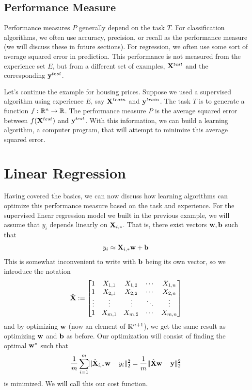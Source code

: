 \subsection{Performance Measure}

Performance measures $P$ generally depend on the task $T$. For classification algorithms, we often use accuracy, precision, or recall as the performance measure (we will discuss these in future sections). For regression, we often use some sort of average squared error in prediction. This performance is not measured from the experience set $E$, but from a different set of examples, $\MX^{test}$ and the corresponding $\vy^{test}$.

\begin{example}
Let's continue the example for housing prices. Suppose we used a supervised algorithm using experience $E$, say $\MX^{train}$ and $\vy^{train}$. The task $T$ is to generate a function $f : \R^n \to \R$. The performance measure $P$ is the average squared error between $f(\MX^{test})$ and $\vy^{test}$. With this information, we can build a learning algorithm, a computer program, that will attempt to minimize this average squared error.
\end{example}

\section{Linear Regression}

Having covered the basics, we can now discuss how learning algorithms can optimize this performance measure based on the task and experience. For the supervised linear regression model we built in the previous example, we will assume that $y_i$ depends linearly on $\MX_{i,\ast}$. That is, there exist vectors $\vw, \vb$ such that
$$ y_i \approx \MX_{i, \ast} \vw + \vb $$
This is somewhat inconvenient to write with $\vb$ being its own vector, so we introduce the notation
$$\hat{\MX} :=
\begin{bmatrix}
1 & X_{1,1} & X_{1,2} & \cdots & X_{1,n} \\
1 & X_{2,1} & X_{2,2} & \cdots & X_{2,n} \\
\vdots & \vdots & \vdots & \ddots & \vdots \\
1 & X_{m,1} & X_{m,2} & \cdots & X_{m,n} \\
\end{bmatrix}$$
and by optimizing $\vw$ (now an element of $\R^{n+1}$), we get the same result as optimizing $\vw$ and $\vb$ as before. Our optimization will consist of finding the optimal $\vw^\ast$ such that
$$ \frac{1}{m} \sum \limits_{i=1}^m \lVert \hat{\MX}_{i,\ast} \vw - y_i \rVert_2^2 =  \frac{1}{m} \lVert \hat{\MX} \vw - \vy \rVert_2^2$$
is minimized. We will call this our cost function.

